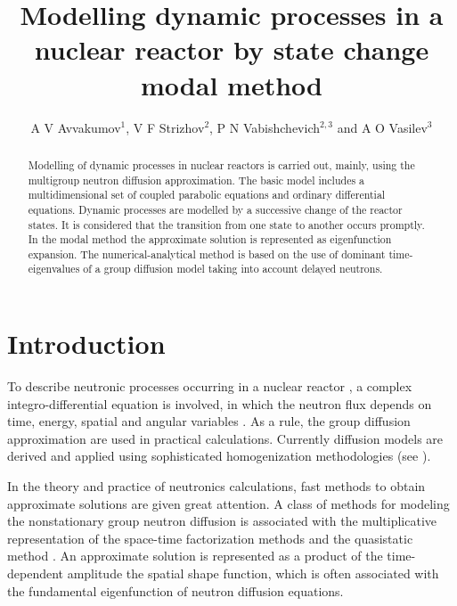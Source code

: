\documentclass[a4paper]{jpconf}
\begin{document}
\title{Modelling dynamic processes in a nuclear reactor by state change modal method}

\author{A V Avvakumov$^1$, V F Strizhov$^2$, P N Vabishchevich$^{2,3}$ and A O Vasilev$^3$}

\address{$^1$ National Research Center Kurchatov Institute, Moscow, Russia}
\address{$^2$ Nuclear Safety Institute of RAS, Moscow, Russia}
\address{$^3$ North-Eastern Federal University, Yakutsk, Russia}


\begin{abstract}
Modelling of dynamic processes in nuclear reactors is carried out, mainly, using the multigroup neutron diffusion approximation. 
The basic model includes a multidimensional set of coupled parabolic equations and ordinary differential equations.
Dynamic processes are modelled by a successive
change of the reactor states. It is considered that the transition from one state to another occurs promptly.
In the modal method the approximate solution is represented as eigenfunction expansion. 
The numerical-analytical method is based on the use of dominant time-eigenvalues of
a group diffusion model taking into account delayed neutrons. 
\end{abstract}

\section{Introduction}
To describe neutronic processes occurring in a nuclear reactor  \cite{duderstadt1976nuclear}, a complex integro-differential equation is involved, in which the neutron flux depends on time, energy, spatial and angular variables  \cite{stacey}. As a rule,  the group diffusion  approximation  are used  \cite{marchuk1986numerical} in practical calculations.
Currently diffusion models are derived and applied using sophisticated homogenization methodologies (see \cite{sanchez2009assembly}). 

In the theory and practice of neutronics calculations, fast methods to obtain approximate solutions are given great attention. A class of methods for modeling the nonstationary group neutron diffusion is associated with the multiplicative representation of the space-time factorization methods and the quasistatic method \cite{dodds1976accuracy}.
An approximate solution is represented as a product of the time-dependent amplitude the spatial shape function, which is often associated with the fundamental eigenfunction of neutron diffusion equations. 
\end{document}
